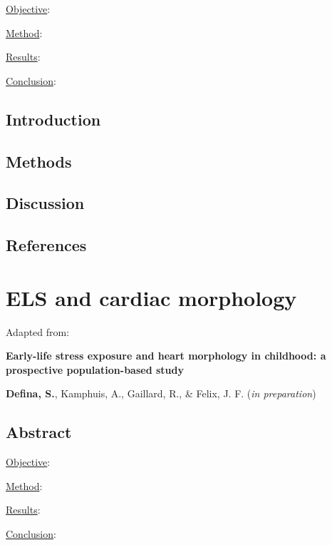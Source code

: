 \documentclass[
  letterpaper,
  DIV=11,
  numbers=noendperiod]{scrreport}
\begin{document}

\ul{Objective}:

\ul{Method}:

\ul{Results}:

\ul{Conclusion}:

\newpage

\section{Introduction}\label{introduction-2}

\section{Methods}\label{methods-2}

\section{Discussion}\label{discussion-2}

\section*{References}\label{references-3}


\chapter{ELS and cardiac morphology}\label{sec-chapter5}

Adapted from:

\textbf{Early-life stress exposure and heart morphology in childhood: a
prospective population-based study}

\textbf{Defina, S.}, Kamphuis, A., Gaillard, R., \& Felix, J. F.
(\emph{in preparation})

\section*{Abstract}\label{abstract-3}


\ul{Objective}:

\ul{Method}:

\ul{Results}:

\ul{Conclusion}:

\newpage
\end{document}
